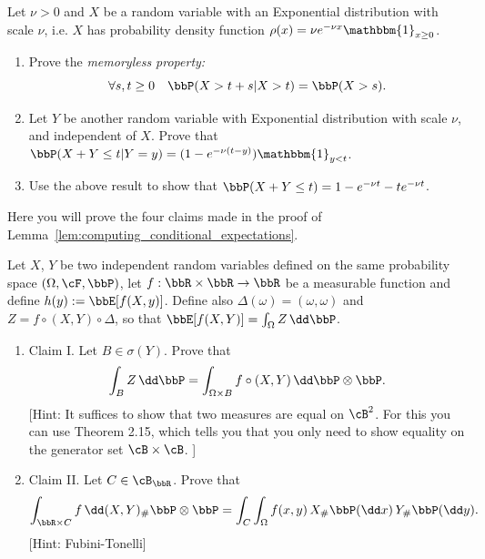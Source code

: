 \begin{problem}
Let $\nu > 0$ and $X$ be a random variable with an Exponential distribution with scale $\nu$, i.e. $X$ has probability density function $\rho(x) = \nu e^{-\nu x} \mathbbm{1}_{x \ge 0}$.
\begin{enumerate}[label={(\alph*)}]
\item Prove the \emph{memoryless property:}
\[
	\forall s,t \ge 0 \quad \bbP(X > t+s | X > t) = \bbP(X > s).
\]
\item Let $Y$ be another random variable with Exponential distribution with scale $\nu$, and independent of $X$. Prove that $\bbP(X + Y \le t | Y = y) = (1 - e^{-\nu (t - y)}) \mathbbm{1}_{y < t}$.
\item Use the above result to show that $\bbP(X + Y \le t) = 1 - e^{-\nu t} - t e^{-\nu t}$. 
\end{enumerate}

\end{problem}

\begin{problem}\label{prb:computing_conditional_expectations}
Here you will prove the four claims made in the proof of Lemma~\ref{lem:computing_conditional_expectations}.

Let $X$, $Y$ be two independent random variables defined on the same probability space $(\Omega, \cF, \bbP)$, let $f : \bbR \times \bbR \to \bbR$ be a measurable function and define $h(y) := \bbE[f(X,y)]$. Define also $\Delta(\omega) = (\omega, \omega)$ and $Z = f \circ (X, Y) \circ \Delta$, so that $\bbE[f(X,Y)] = \int_\Omega Z \, \dd \bbP$.

\begin{enumerate}[label={(\alph*)}]
\item Claim I. Let $B \in \sigma(Y)$. Prove that
\[
	\int_{B} Z \, \dd \bbP = \int_{\Omega \times B} f \circ (X,Y) \, \dd \bbP \otimes \bbP.
\]
[Hint: It suffices to show that two measures are equal on $\cB^2$. For this you can use Theorem 2.15, which tells you that you only need to show equality on the generator set $\cB \times \cB$.
]
\item Claim II. Let $C \in \cB_{\bbR}$. Prove that
\[
	\int_{\bbR \times C} f \, \dd (X,Y)_\# \bbP \otimes \bbP
	= \int_C \int_\Omega f(x,y) \, X_\#\bbP(\dd x) \, Y_\# \bbP (\dd y).
\]
[Hint: Fubini-Tonelli]
\end{enumerate}
\end{problem}


